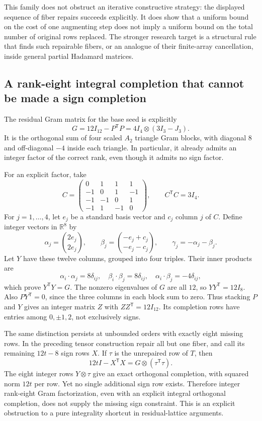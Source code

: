This family does not obstruct an iterative constructive strategy:
the displayed sequence of fiber repairs succeeds explicitly. It does
show that a uniform bound on the cost of one augmenting step does not
imply a uniform bound on the total number of original rows replaced.
The stronger research target is a structural rule that finds such
repairable fibers, or an analogue of their finite-array cancellation,
inside general partial Hadamard matrices.

\subsection{A rank-eight integral completion that cannot be made a sign completion}
The residual Gram matrix for the base seed is explicitly
\[
 G=12I_{12}-P^{\mathsf T}P
   =4I_4\otimes(3I_3-J_3).
\]
It is the orthogonal sum of four scaled $A_2$ triangle Gram blocks,
with diagonal $8$ and off-diagonal $-4$ inside each triangle.
In particular, it already admits an integer factor of the correct
rank, even though it admits no sign factor.

For an explicit factor, take
\[
 C=\begin{pmatrix}
 0&1&1&1\\-1&0&1&-1\\-1&-1&0&1\\-1&1&-1&0
 \end{pmatrix},\qquad C^{\mathsf T}C=3I_4.
\]
For $j=1,\ldots,4$, let $e_j$ be a standard basis vector and $c_j$
column $j$ of $C$. Define integer vectors in $\mathbb R^8$ by
\[
 \alpha_j=\binom{2e_j}{2e_j},\qquad
 \beta_j=\binom{-e_j+c_j}{-e_j-c_j},\qquad
 \gamma_j=-\alpha_j-\beta_j.
\]
Let $Y$ have these twelve columns, grouped into four triples.
Their inner products are
\[
 \alpha_i\cdot\alpha_j=8\delta_{ij},\quad
 \beta_i\cdot\beta_j=8\delta_{ij},\quad
 \alpha_i\cdot\beta_j=-4\delta_{ij},
\]
which prove $Y^{\mathsf T}Y=G$. The nonzero eigenvalues of $G$ are
all $12$, so $YY^{\mathsf T}=12I_8$. Also $PY^{\mathsf T}=0$,
since the three columns in each block sum to zero. Thus stacking
$P$ and $Y$ gives an integer matrix $Z$ with
$ZZ^{\mathsf T}=12I_{12}$. Its completion rows have entries among
$0,\pm1,2$, not exclusively signs.

The same distinction persists at unbounded orders with exactly eight
missing rows. In the preceding tensor construction repair all but one
fiber, and call its remaining $12t-8$ sign rows $X$. If $\tau$ is the
unrepaired row of $T$, then
\[
 12tI-X^{\mathsf T}X=G\otimes(\tau^{\mathsf T}\tau).
\]
The eight integer rows $Y\otimes\tau$ give an exact orthogonal
completion, with squared norm $12t$ per row. Yet no single additional
sign row exists. Therefore integer rank-eight Gram factorization,
even with an explicit integral orthogonal completion, does not supply
the missing sign constraint. This is an explicit obstruction to a
pure integrality shortcut in residual-lattice arguments.


